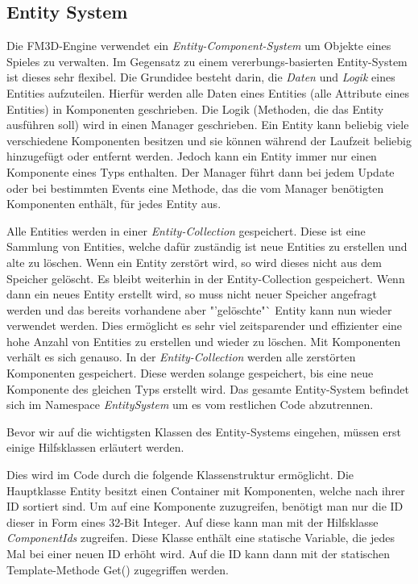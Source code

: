 \subsection{Entity System}
\label{entitysystem}
Die FM3D-Engine verwendet ein \textit{Entity-Component-System} um Objekte eines Spieles zu verwalten. Im Gegensatz zu einem vererbungs-basierten Entity-System ist dieses sehr flexibel. 
Die Grundidee besteht darin, die \textit{Daten} und \textit{Logik} eines Entities aufzuteilen. Hierfür werden alle Daten eines Entities (alle Attribute eines Entities) in Komponenten geschrieben. %
Die Logik (Methoden, die das Entity ausführen soll) wird in einen Manager geschrieben. 
Ein Entity kann beliebig viele verschiedene Komponenten besitzen und sie können während der Laufzeit beliebig hinzugefügt oder entfernt werden. Jedoch kann ein Entity immer nur einen Komponente eines Typs enthalten. 
Der Manager führt dann bei jedem Update oder bei bestimmten Events eine Methode, das die vom Manager benötigten Komponenten enthält, für jedes Entity aus.

Alle Entities werden in einer \textit{Entity-Collection} gespeichert. Diese ist eine Sammlung von Entities, welche dafür zuständig ist neue Entities zu erstellen und alte zu löschen. Wenn ein Entity zerstört wird, so wird dieses nicht aus dem Speicher gelöscht. Es bleibt weiterhin in der Entity-Collection gespeichert. 
Wenn dann ein neues Entity erstellt wird, so muss nicht neuer Speicher angefragt werden und das bereits vorhandene aber "'gelöschte"` Entity kann nun wieder verwendet werden. Dies ermöglicht es sehr viel zeitsparender und effizienter eine hohe Anzahl von Entities zu erstellen und wieder zu löschen. 
Mit Komponenten verhält es sich genauso. In der \textit{Entity-Collection} werden alle zerstörten Komponenten gespeichert. Diese werden solange gespeichert, bis eine neue Komponente des gleichen Typs erstellt wird. Das gesamte Entity-System befindet sich im Namespace \textit{EntitySystem} um es vom restlichen Code abzutrennen.

Bevor wir auf die wichtigsten Klassen des Entity-Systems eingehen, müssen erst einige Hilfsklassen erläutert werden.

Dies wird im Code durch die folgende Klassenstruktur ermöglicht. Die Hauptklasse Entity besitzt einen Container mit Komponenten, welche nach ihrer ID sortiert sind. Um auf eine Komponente zuzugreifen, benötigt man nur die ID dieser in Form eines 32-Bit Integer. Auf diese kann man mit der Hilfsklasse \textit{ComponentIds} zugreifen. 
Diese Klasse enthält eine statische Variable, die jedes Mal bei einer neuen ID erhöht wird. Auf die ID kann dann mit der statischen Template-Methode Get() zugegriffen werden.
 
